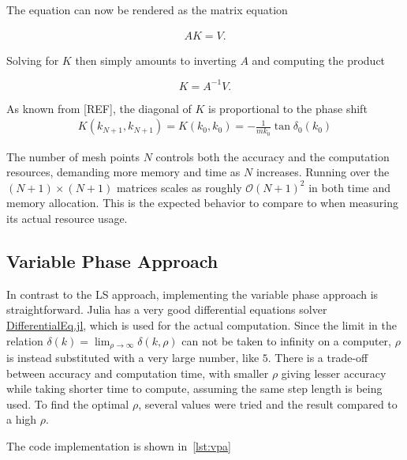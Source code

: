 The equation can now be rendered as the matrix equation

\begin{align*}
  AK = V.
\end{align*}

Solving for \(K\) then simply amounts to inverting \(A\) and computing the
product

\begin{equation}
  K = A^{-1}V.\label{eq:matrixeq}
\end{equation}

As known from [REF], the diagonal of \(K\) is proportional to the phase shift
\begin{align*}
  K(k_{N+1}, k_{N+1}) = K(k_{0}, k_{0}) = -\frac{1}{mk_{0}}\tan\delta_{0}(k_{0})
\end{align*}

The number of mesh points \(N\) controls both the accuracy and the computation
resources, demanding more memory and time as \(N\) increases. Running over the
\((N+1)\times (N+1)\) matrices scales as roughly \(\mathcal{O}(N+1)^{2}\) in
both time and memory allocation. This is the expected behavior to compare to
when measuring its actual resource usage.

\subsection{Variable Phase Approach}
In contrast to the LS approach, implementing the variable phase approach is
straightforward. Julia has a very good differential equations solver
\href{https://diffeq.sciml.ai/stable/#Getting-Started:-Installation-And-First-Steps}{DifferentialEq.jl}\cite{rackauckas2017differentialequations}, which is used for the actual computation.
Since the limit in the relation \(\delta(k) =
\lim_{\rho\to\infty}\delta(k, \rho)\) can not be taken to infinity on a computer, 
\(\rho\) is instead substituted with a very large number, like \(5\). There is a
trade-off between accuracy and computation time, with smaller \(\rho\) giving
lesser accuracy while taking shorter time to compute, assuming the same step
length is being used. To find the optimal \(\rho\), several values were tried
and the result compared to a high \(\rho\).

The code implementation is shown in~\cref{lst:vpa}

